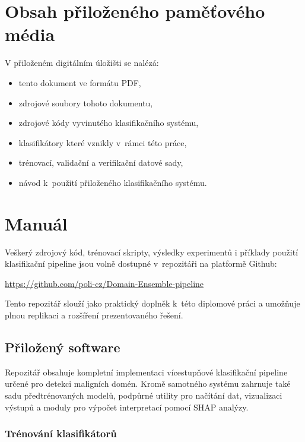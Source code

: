\chapter{Obsah přiloženého paměťového média}
V přiloženém digitálním úložišti se nalézá:
\begin{itemize}
    \item tento dokument ve formátu PDF,
    \item zdrojové soubory tohoto dokumentu,
    \item zdrojové kódy vyvinutého klasifikačního systému,
    \item klasifikátory které vznikly v~rámci této práce,
    \item trénovací, validační a verifikační datové sady,
    \item návod k~použití přiloženého klasifikačního systému.
\end{itemize}





\chapter{Manuál}

Veškerý zdrojový kód, trénovací skripty, výsledky experimentů i příklady použití klasifikační pipeline jsou volně dostupné v~repozitáři na platformě Github:

\begin{center}
\url{https://github.com/poli-cz/Domain-Ensemble-pipeline}
\end{center}

\noindent Tento repozitář slouží jako praktický doplněk k~této diplomové práci a umožňuje plnou replikaci a rozšíření prezentovaného řešení.

\section*{Přiložený software}

Repozitář obsahuje kompletní implementaci vícestupňové klasifikační pipeline určené pro detekci maligních domén. Kromě samotného systému zahrnuje také sadu předtrénovaných modelů, podpůrné utility pro načítání dat, vizualizaci výstupů a moduly pro výpočet interpretací pomocí SHAP analýzy.

\subsection*{Trénování klasifikátorů}

